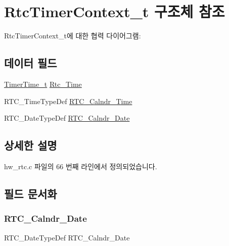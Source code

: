 \hypertarget{struct_rtc_timer_context__t}{}\section{Rtc\+Timer\+Context\+\_\+t 구조체 참조}
\label{struct_rtc_timer_context__t}


Rtc\+Timer\+Context\+\_\+t에 대한 협력 다이어그램\+:
\subsection*{데이터 필드}
\begin{DoxyCompactItemize}
\item 
\mbox{\hyperlink{utilities_8h_a4215ca43d3e953099ea758ce428599d0}{Timer\+Time\+\_\+t}} \mbox{\hyperlink{struct_rtc_timer_context__t_a05f48439ba05c77e6271805cff79760f}{Rtc\+\_\+\+Time}}
\item 
R\+T\+C\+\_\+\+Time\+Type\+Def \mbox{\hyperlink{struct_rtc_timer_context__t_a605148ba4720b20b9ba2445a090a64d4}{R\+T\+C\+\_\+\+Calndr\+\_\+\+Time}}
\item 
R\+T\+C\+\_\+\+Date\+Type\+Def \mbox{\hyperlink{struct_rtc_timer_context__t_a50959be607deb58750ba2eb2afaa7f46}{R\+T\+C\+\_\+\+Calndr\+\_\+\+Date}}
\end{DoxyCompactItemize}


\subsection{상세한 설명}


hw\+\_\+rtc.\+c 파일의 66 번째 라인에서 정의되었습니다.



\subsection{필드 문서화}
\mbox{\label{struct_rtc_timer_context__t_a50959be607deb58750ba2eb2afaa7f46}} 
\subsubsection{\texorpdfstring{R\+T\+C\+\_\+\+Calndr\+\_\+\+Date}{RTC\_Calndr\_Date}}
{\footnotesize\ttfamily R\+T\+C\+\_\+\+Date\+Type\+Def R\+T\+C\+\_\+\+Calndr\+\_\+\+Date}



